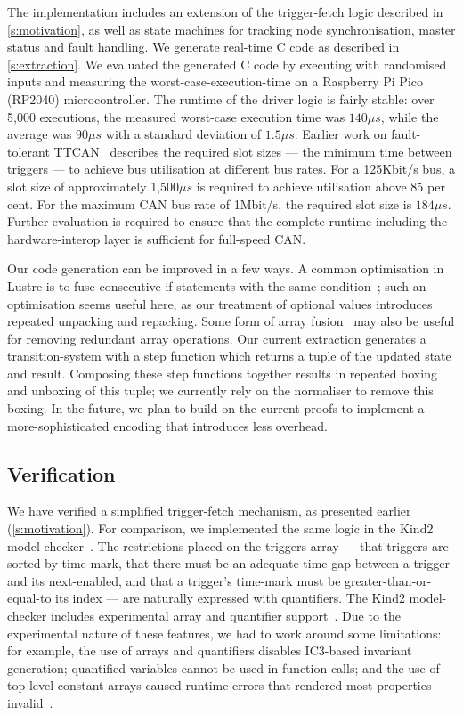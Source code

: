\documentclass[a4paper,UKenglish,cleveref, autoref, thm-restate,anonymous]{lipics-v2021}
\begin{document}
The implementation includes an extension of the trigger-fetch logic described in \autoref{s:motivation}, as well as state machines for tracking node synchronisation, master status and fault handling.
We generate real-time C code as described in \autoref{s:extraction}.
We evaluated the generated C code by executing with randomised inputs and measuring the worst-case-execution-time on a Raspberry Pi Pico (RP2040) microcontroller.
The runtime of the driver logic is fairly stable: over 5,000 executions, the measured worst-case execution time was $140\mu{}s$, while the average was $90\mu{}s$ with a standard deviation of $1.5\mu{}s$.
Earlier work on fault-tolerant TTCAN~\cite{short2007fault} describes the required slot sizes --- the minimum time between triggers --- to achieve bus utilisation at different bus rates.
For a 125Kbit/s bus, a slot size of approximately 1,500$\mu{}s$ is required to achieve utilisation above 85 per cent.
For the maximum CAN bus rate of 1Mbit/s, the required slot size is $184\mu{}s$.
Further evaluation is required to ensure that the complete runtime including the hardware-interop layer is sufficient for full-speed CAN.

Our code generation can be improved in a few ways.
A common optimisation in Lustre is to fuse consecutive if-statements with the same condition~\cite{bourke2017formally}; such an optimisation seems useful here, as our treatment of optional values introduces repeated unpacking and repacking.
Some form of array fusion~\cite{robinson2017machine} may also be useful for removing redundant array operations.
Our current extraction generates a transition-system with a step function which returns a tuple of the updated state and result.
Composing these step functions together results in repeated boxing and unboxing of this tuple; we currently rely on the \fstar{} normaliser to remove this boxing.
In the future, we plan to build on the current proofs to implement a more-sophisticated encoding that introduces less overhead.

\subsection{Verification}

We have verified a simplified trigger-fetch mechanism, as presented earlier (\autoref{s:motivation}).
For comparison, we implemented the same logic in the Kind2 model-checker~\cite{champion2016kind2}.
The restrictions placed on the triggers array --- that triggers are sorted by time-mark, that there must be an adequate time-gap between a trigger and its next-enabled, and that a trigger's time-mark must be greater-than-or-equal-to its index --- are naturally expressed with quantifiers.
The Kind2 model-checker includes experimental array and quantifier support~\cite{kind2userdoc}.
Due to the experimental nature of these features, we had to work around some limitations: for example, the use of arrays and quantifiers disables IC3-based invariant generation; quantified variables cannot be used in function calls; and the use of top-level constant arrays caused runtime errors that rendered most properties invalid~\cite{kind2024toparray}.
\end{document}
